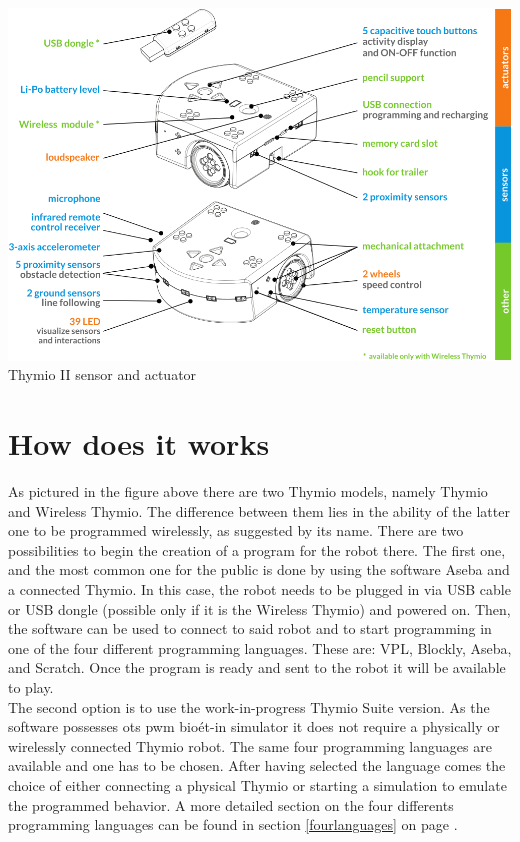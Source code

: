 \documentclass{scrreprt}
\begin{document}
\begin{center}
  \includegraphics[width=\textwidth]{Wireless-thymioII-sensor-actuator-color-en}\\
  Thymio II sensor and actuator
\end{center}

\section{How does it works \label{howdoesitworkref}} 

As pictured in the figure above there are two Thymio models, namely Thymio and Wireless Thymio. 
The difference between them lies in the ability of the latter one to be programmed wirelessly, 
as suggested by its name. There are two possibilities to begin the creation of a program for the robot there.
The first one, and the most common one for the public is done by using the software Aseba and a connected Thymio. 
In this case, the robot needs to be plugged in via USB cable or USB dongle (possible only if it is the Wireless Thymio) and powered on. 
Then, the software can be used to connect to said robot and to start programming in one of the four different programming languages. 
These are: VPL, Blockly, Aseba, and Scratch. Once the program is ready and sent to the robot it will be available to play. \\

The second option is to use the work-in-progress Thymio Suite version. 
As the software possesses ots pwm bioét-in simulator it does not require a physically or wirelessly connected Thymio robot. 
The same four programming languages are available and one has to be chosen. 
After having selected the language comes the choice of either connecting a physical Thymio or starting a simulation to emulate the programmed behavior.
A more detailed section on the four differents programming languages can be found in section \ref{fourlanguages} on page \pageref{fourlanguages}.
\end{document}
